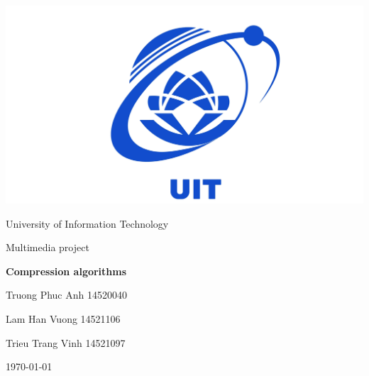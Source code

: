 \begin{titlepage}
\thispagestyle{empty}
\setlength\headheight{0pt} 
\begin{center}
\begin{center}
\includegraphics[width=0.5\linewidth]{images/logo.jpg}
\end{center}
\vspace{0.5cm}   
{\Large University of Information Technology \par}
\vspace{0.25cm}
{\Large Multimedia project\par}
\vspace{0.25cm}
{\Large\bfseries Compression algorithms\par}
\vspace{0.5cm}
{Truong Phuc Anh 	14520040\par}
{Lam Han Vuong 		14521106\par}
{Trieu Trang Vinh 	14521097\par}
\vspace{0.5cm}
\today
\end{center}
\end{titlepage}
